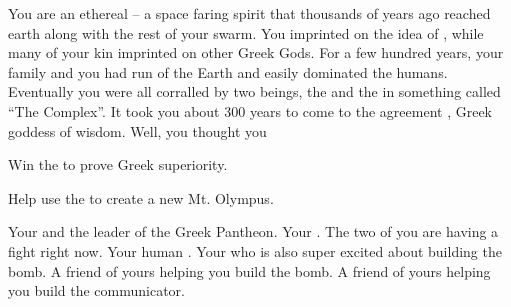 \documentclass[char]{guardians}
\begin{document}
\name{\cAthena{}}

You are an ethereal -- a space faring spirit that thousands of years ago reached earth along with the rest of your swarm. You imprinted on the idea of \cAthena{}, while many of your kin imprinted on other Greek Gods. For a few hundred years, your family and you had run of the Earth and easily dominated the humans. Eventually you were all corralled by two beings, the \cCaretaker{} and the \cWarden{} in something called ``The Complex''. It took you about 300 years to come to the agreement \cAthena{}, Greek goddess of wisdom. Well, you thought you 

\begin{itemz}[Goals]
  \item Win the \pGames{} to prove Greek superiority.
  \item Help \cZeus{} use the \stone{} to create a new Mt. Olympus.
  \item 
\end{itemz}


\begin{contacts}
  \contact{\cZeus{}} Your \cZeus{\parent} and the leader of the Greek Pantheon.
  \contact{\cHera{}} Your \cHera{\parent}. The two of you are having a fight right now.
  \contact{\cPandora{}} Your human \cPandora{\sibling}.
  \contact{\cHephaestus{}} Your \cHephaestus{\sibling} who is also super excited about building the bomb.
  \contact{\cVal{}} A friend of yours helping you build the bomb.
  \contact{\cFenrir{}} A friend of yours helping you build the communicator.
\end{contacts}
\end{document}
